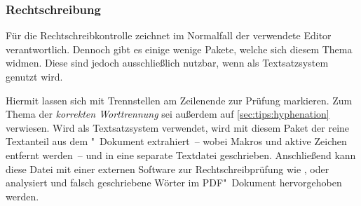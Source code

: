 \subsubsection{%
  Rechtschreibung%
}
%
Für die Rechtschreibkontrolle zeichnet im Normalfall der verwendete Editor 
verantwortlich. Dennoch gibt es einige wenige Pakete, welche sich diesem Thema 
widmen. Diese sind jedoch ausschließlich nutzbar, wenn als Textsatzsystem 
 genutzt wird.
\begin{DeclarePackages}
  Hiermit lassen sich mit  Trennstellen am Zeilenende zur 
  Prüfung markieren. Zum Thema der \textit{korrekten Worttrennung} sei außerdem 
  auf \autoref{sec:tips:hyphenation} verwiesen.
  Wird  als Textsatzsystem verwendet, wird mit diesem Paket 
  der reine Textanteil aus dem "~Dokument extrahiert~-- wobei 
  Makros und aktive Zeichen entfernt werden~-- und in eine separate Textdatei 
  geschrieben. Anschließend kann diese Datei mit einer externen Software zur  
  Rechtschreibprüfung wie ,  oder 
   analysiert und falsch geschriebene Wörter im 
  PDF"~Dokument hervorgehoben werden.
\end{DeclarePackages}
%



